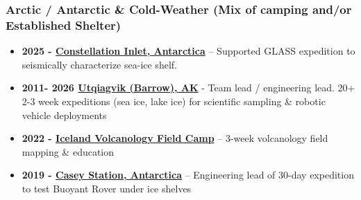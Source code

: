 \documentclass[11pt,letterpaper]{article}
\begin{document}
\subsubsection*{Arctic / Antarctic \& Cold-Weather (Mix of camping and/or Established Shelter)}
\begin{itemize}
\item \textbf{2025 - \href{https://www.brinsonhub.caltech.edu/projects/glass/field-notes}{Constellation Inlet, Antarctica}} – Supported GLASS expedition to seismically characterize sea-ice shelf.
\item \textbf{2011- 2026 \href{https://www.jpl.nasa.gov/robotics-at-jpl/bruie/}{Utqiagvik (Barrow), AK}} - Team lead / engineering lead. 20+ 2-3 week expeditions (sea ice, lake ice) for scientific sampling \& robotic vehicle deployments
\item \textbf{2022 - \href{https://geologyfieldcamp.sdsmt.edu/IcelandVolcanologyCamp.htm}{Iceland Volcanology Field Camp}} – 3-week volcanology field mapping \& education
\item \textbf{2019 - \href{https://www.nytimes.com/2020/01/05/science/europa-rover-antarctica.html}{Casey Station, Antarctica}} – Engineering lead of 30-day expedition to test Buoyant Rover under ice shelves
\end{itemize}
\end{document}
